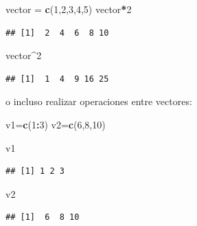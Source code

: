 \documentclass[
]{book}
\newenvironment{Shaded}{\begin{snugshade}}{\end{snugshade}}
\newcommand{\DecValTok}[1]{\textcolor[rgb]{0.00,0.00,0.81}{#1}}
\newcommand{\FunctionTok}[1]{\textcolor[rgb]{0.13,0.29,0.53}{\textbf{#1}}}
\newcommand{\NormalTok}[1]{#1}
\newcommand{\OtherTok}[1]{\textcolor[rgb]{0.56,0.35,0.01}{#1}}
\newcommand{\SpecialCharTok}[1]{\textcolor[rgb]{0.81,0.36,0.00}{\textbf{#1}}}
\begin{document}
\begin{Shaded}
\begin{Highlighting}[]
\NormalTok{vector }\OtherTok{=} \FunctionTok{c}\NormalTok{(}\DecValTok{1}\NormalTok{,}\DecValTok{2}\NormalTok{,}\DecValTok{3}\NormalTok{,}\DecValTok{4}\NormalTok{,}\DecValTok{5}\NormalTok{)}
\NormalTok{vector}\SpecialCharTok{*}\DecValTok{2}
\end{Highlighting}
\end{Shaded}

\begin{verbatim}
## [1]  2  4  6  8 10
\end{verbatim}

\begin{Shaded}
\begin{Highlighting}[]
\NormalTok{vector}\SpecialCharTok{\^{}}\DecValTok{2}
\end{Highlighting}
\end{Shaded}

\begin{verbatim}
## [1]  1  4  9 16 25
\end{verbatim}

o incluso realizar operaciones entre vectores:

\begin{Shaded}
\begin{Highlighting}[]
\NormalTok{v1}\OtherTok{=}\FunctionTok{c}\NormalTok{(}\DecValTok{1}\SpecialCharTok{:}\DecValTok{3}\NormalTok{)}
\NormalTok{v2}\OtherTok{=}\FunctionTok{c}\NormalTok{(}\DecValTok{6}\NormalTok{,}\DecValTok{8}\NormalTok{,}\DecValTok{10}\NormalTok{)}
\end{Highlighting}
\end{Shaded}

\begin{Shaded}
\begin{Highlighting}[]
\NormalTok{v1}
\end{Highlighting}
\end{Shaded}

\begin{verbatim}
## [1] 1 2 3
\end{verbatim}

\begin{Shaded}
\begin{Highlighting}[]
\NormalTok{v2}
\end{Highlighting}
\end{Shaded}

\begin{verbatim}
## [1]  6  8 10
\end{verbatim}
\end{document}
